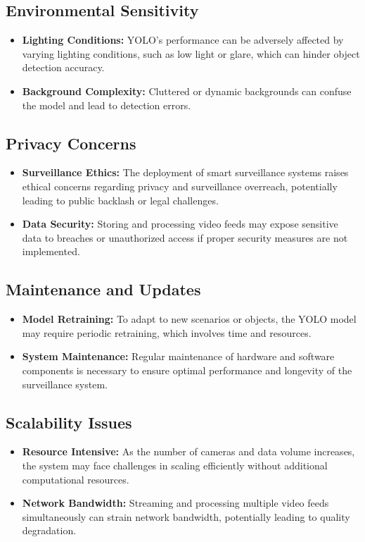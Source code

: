 \documentclass[openany,12pt]{report}
\begin{document}
\subsection*{Environmental Sensitivity}
\begin{itemize}
    \item \textbf{Lighting Conditions:} YOLO's performance can be adversely affected by varying lighting conditions, such as low light or glare, which can hinder object detection accuracy.
    \item \textbf{Background Complexity:} Cluttered or dynamic backgrounds can confuse the model and lead to detection errors.
\end{itemize}

\subsection*{Privacy Concerns}
\begin{itemize}
    \item \textbf{Surveillance Ethics:} The deployment of smart surveillance systems raises ethical concerns regarding privacy and surveillance overreach, potentially leading to public backlash or legal challenges.
    \item \textbf{Data Security:} Storing and processing video feeds may expose sensitive data to breaches or unauthorized access if proper security measures are not implemented.
\end{itemize}

\subsection*{Maintenance and Updates}
\begin{itemize}
    \item \textbf{Model Retraining:} To adapt to new scenarios or objects, the YOLO model may require periodic retraining, which involves time and resources.
    \item \textbf{System Maintenance:} Regular maintenance of hardware and software components is necessary to ensure optimal performance and longevity of the surveillance system.
\end{itemize}

\subsection*{Scalability Issues}
\begin{itemize}
    \item \textbf{Resource Intensive:} As the number of cameras and data volume increases, the system may face challenges in scaling efficiently without additional computational resources.
    \item \textbf{Network Bandwidth:} Streaming and processing multiple video feeds simultaneously can strain network bandwidth, potentially leading to quality degradation.
\end{itemize}
\end{document}
